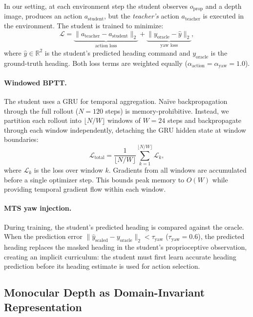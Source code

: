 \documentclass[10pt,twocolumn]{article}
\newcommand{\R}{\mathbb{R}}
\begin{document}
In our setting, at each environment step the student observes
$o_\text{prop}$ and a depth image, produces an action
$a_\text{student}$, but the \emph{teacher's} action $a_\text{teacher}$
is executed in the environment.  The student is trained to minimize:
\begin{equation}
  \mathcal{L} =
  \underbrace{\|a_\text{teacher} - a_\text{student}\|_2}_{\text{action loss}}
  + \underbrace{\|y_\text{oracle} - \hat{y}\|_2}_{\text{yaw loss}},
  \label{eq:dagger_loss}
\end{equation}
where $\hat{y} \in \R^2$ is the student's predicted heading
command and $y_\text{oracle}$ is the ground-truth heading.
Both loss terms are weighted equally ($\alpha_\text{action} =
\alpha_\text{yaw} = 1.0$).

\paragraph{Windowed BPTT.}
The student uses a GRU for temporal aggregation.  Na\"ive
backpropagation through the full rollout ($N = 120$ steps) is
memory-prohibitive.  Instead, we partition each rollout into
$\lfloor N/W \rfloor$ windows of $W = 24$ steps and backpropagate
through each window independently, detaching the GRU hidden state
at window boundaries:
\begin{equation}
  \mathcal{L}_{\text{total}} = \frac{1}{\lfloor N/W \rfloor}
  \sum_{k=1}^{\lfloor N/W \rfloor} \mathcal{L}_k,
  \label{eq:bptt}
\end{equation}
where $\mathcal{L}_k$ is the loss over window $k$.  Gradients from
all windows are accumulated before a single optimizer step.  This
bounds peak memory to $O(W)$ while providing temporal gradient flow
within each window.

\paragraph{MTS yaw injection.}
During training, the student's predicted heading is compared against
the oracle.  When the prediction error
$\|\hat{y}_\text{scaled} - y_\text{oracle}\|_2 < \tau_\text{yaw}$
($\tau_\text{yaw} = 0.6$), the predicted heading replaces the
masked heading in the student's proprioceptive observation,
creating an implicit curriculum: the student must first learn accurate
heading prediction before its heading estimate is used for
action selection.

\subsection{Monocular Depth as Domain-Invariant Representation}
\label{sec:depth_theory}
\end{document}
